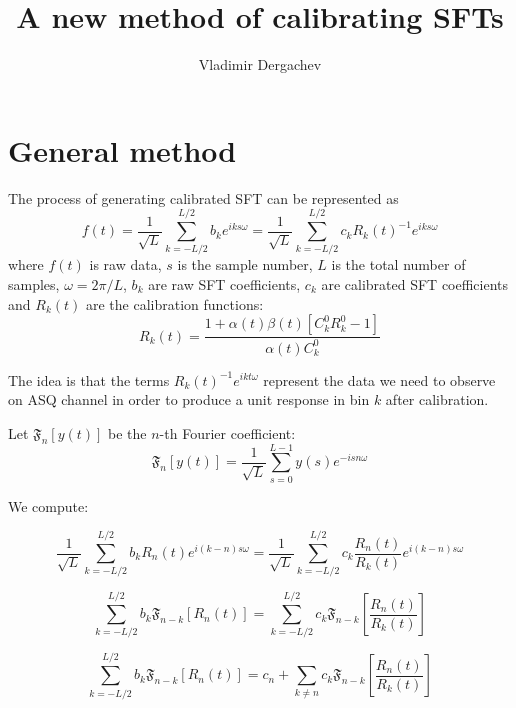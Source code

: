 \documentclass[12pt]{article}
\title{A new method of calibrating SFTs}
\author{Vladimir Dergachev}
\def\FTC#1#2{{\mathfrak F}_{#1}\left[#2\right]}
\def\FFTNORM{\frac{1}{\sqrt{ L}}}
\begin{document}
\maketitle
\tableofcontents
\listoffigures

\newpage
\section{General method}
\label{general_method}
The process of generating calibrated SFT can be represented as
$$
f(t)=\FFTNORM\sum_{k=-L/2}^{L/2}b_k e^{iks\omega}=\FFTNORM\sum_{k=-L/2}^{L/2}c_k R_k(t)^{-1}e^{iks\omega}
$$
where $f(t)$ is raw data, $s$ is the sample number, $L$ is the total number of samples,
 $\omega=2\pi/L$,  $b_k$ are raw SFT coefficients, $c_k$ are calibrated SFT coefficients
and $R_k(t)$ are the calibration functions:
$$
R_k(t)=\frac{1+\alpha(t)\beta(t) [C^0_kR^0_k-1]}{\alpha(t)C^0_k}
$$

The idea is that the terms $R_k(t)^{-1}e^{ikt\omega}$ represent the data we need to observe on ASQ
channel in order to produce a unit response in bin $k$ after calibration.

Let $\FTC{n}{y(t)}$ be the $n$-th Fourier coefficient:
$$
\FTC{n}{y(t)}=\FFTNORM \sum_{s=0}^{L-1}y(s)e^{-isn\omega}
$$

We compute:

\begin{equation} 
\label{gen_eqn}
\FFTNORM\sum_{k=-L/2}^{L/2}b_k R_n(t) e^{i(k-n)s\omega}=\FFTNORM\sum_{k=-L/2}^{L/2}c_k \frac{R_n(t)}{R_k(t)}e^{i(k-n)s\omega}
\end{equation}

$$
\sum_{k=-L/2}^{L/2} b_k \FTC{n-k}{R_n(t)}=\sum_{k=-L/2}^{L/2} c_k \FTC{n-k}{\frac{R_n(t)}{R_k(t)}}
$$

$$
\sum_{k=-L/2}^{L/2} b_k \FTC{n-k}{R_n(t)}=c_n+\sum_{k\neq n} c_k \FTC{n-k}{\frac{R_n(t)}{R_k(t)}}
$$
\end{document}
